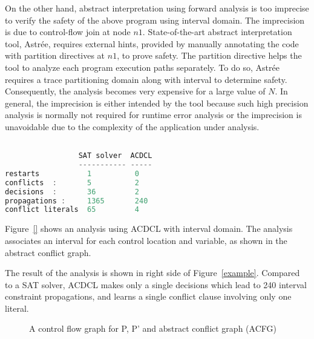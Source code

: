 On the other hand, abstract interpretation using forward analysis 
is too imprecise to verify the safety of the above program using 
interval domain.  The imprecision is due to control-flow join at 
node $n1$.  State-of-the-art abstract interpretation tool, Astr{\'e}e, 
requires external hints, provided by manually annotating the code 
with partition directives at $n1$, to prove safety.  The partition 
directive helps the tool to analyze each program execution paths separately.  
To do so, Astr{\'e}e requires a trace partitioning domain along with interval 
to determine safety.  Consequently, the analysis becomes very expensive 
for a large value of $N$.  In general, the imprecision is either intended by 
the tool because such high precision analysis is normally not required for runtime error analysis or the imprecision is unavoidable due to the complexity 
of the application under analysis.  

\begin{lstlisting}[mathescape=true,language=C]

                 SAT solver  ACDCL 
                 ----------- ----- 
restarts           1          0
conflicts  :       5          2
decisions  :       36         2 
propagations :     1365       240  
conflict literals  65         4   
\end{lstlisting}


Figure~\ref{} shows an analysis using ACDCL with interval domain.  The 
analysis associates an interval for each control location and variable, 
as shown in the abstract conflict graph.   

The result of the analysis is shown in right side of Figure~\ref{example}.  
Compared to a SAT solver, ACDCL makes only a single decisions which lead 
to 240 interval constraint propagations, and learns a single conflict clause 
involving only one literal.     



\begin{figure}[htp]
\centering
\vspace*{0.3cm}
\caption{A control flow graph for P, P' and abstract conflict graph (ACFG) \label{fig:filter}}
\end{figure}

